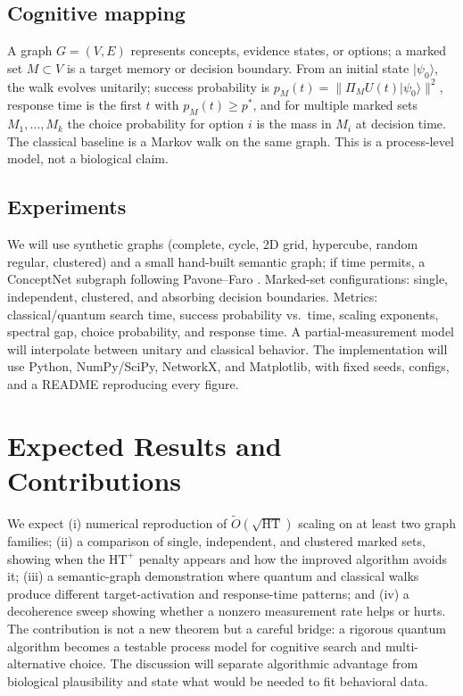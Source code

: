 \documentclass[10pt]{article}
\newcommand{\HT}{\mathrm{HT}}
\newcommand{\HTp}{\mathrm{HT}^{+}}
\newcommand{\Otil}{\widetilde{O}}
\begin{document}
\subsection{Cognitive mapping}
A graph $G=(V,E)$ represents concepts, evidence states, or options; a marked set $M\subset V$ is a target memory or decision boundary. From an initial state $|\psi_0\rangle$, the walk evolves unitarily; success probability is $p_M(t)=\|\Pi_M U(t)|\psi_0\rangle\|^2$, response time is the first $t$ with $p_M(t)\ge p^{*}$, and for multiple marked sets $M_1,\dots,M_k$ the choice probability for option $i$ is the mass in $M_i$ at decision time. The classical baseline is a Markov walk on the same graph. This is a process-level model, not a biological claim.

\subsection{Experiments}
We will use synthetic graphs (complete, cycle, 2D grid, hypercube, random regular, clustered) and a small hand-built semantic graph; if time permits, a ConceptNet subgraph following Pavone--Faro \cite{pavone2025}. Marked-set configurations: single, independent, clustered, and absorbing decision boundaries. Metrics: classical/quantum search time, success probability vs.\ time, scaling exponents, spectral gap, choice probability, and response time. A partial-measurement model will interpolate between unitary and classical behavior. The implementation will use Python, NumPy/SciPy, NetworkX, and Matplotlib, with fixed seeds, configs, and a README reproducing every figure.

\section{Expected Results and Contributions}

We expect (i) numerical reproduction of $\Otil(\sqrt{\HT})$ scaling on at least two graph families; (ii) a comparison of single, independent, and clustered marked sets, showing when the $\HTp$ penalty appears and how the improved algorithm avoids it; (iii) a semantic-graph demonstration where quantum and classical walks produce different target-activation and response-time patterns; and (iv) a decoherence sweep showing whether a nonzero measurement rate helps or hurts. The contribution is not a new theorem but a careful bridge: a rigorous quantum algorithm becomes a testable process model for cognitive search and multi-alternative choice. The discussion will separate algorithmic advantage from biological plausibility and state what would be needed to fit behavioral data.
\end{document}
